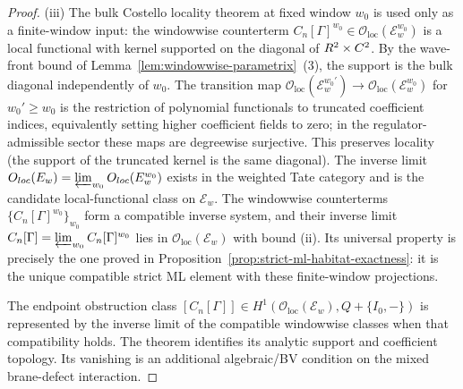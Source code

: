 \begin{proof}
  (iii) The bulk Costello locality theorem at fixed window $w_0$
  is used only as a finite-window input: the windowwise counterterm
  $C_n[\Gamma]^{w_0}\in\mathcal O_{\mathrm{loc}}(\mathcal E_w^{w_0})$
  is a local functional with kernel supported on the diagonal of
  $\R^2\times\C^2$. By the wave-front bound of
  Lemma~\ref{lem:windowwise-parametrix}~(3), the support is the
  bulk diagonal independently of $w_0$. The transition map
  $\mathcal O_{\mathrm{loc}}(\mathcal E_w^{w_0'})\to
  \mathcal O_{\mathrm{loc}}(\mathcal E_w^{w_0})$ for $w_0'\geq w_0$
  is the restriction of polynomial functionals to truncated
  coefficient indices, equivalently setting higher coefficient fields
  to zero; in the regulator-admissible sector these maps are
  degreewise surjective.  This preserves locality (the support of the
  truncated kernel is the same diagonal). The inverse limit
  $\mathcal O_{\mathrm{loc}}(\mathcal E_w)=
  \varprojlim_{w_0}\mathcal O_{\mathrm{loc}}(\mathcal E_w^{w_0})$
  exists in the weighted Tate category and is the candidate
  local-functional class on $\mathcal E_w$. The windowwise counterterms
  $\{C_n[\Gamma]^{w_0}\}_{w_0}$ form a compatible inverse system,
  and their inverse limit
  $C_n[\Gamma]=\varprojlim_{w_0}C_n[\Gamma]^{w_0}$ lies in
  $\mathcal O_{\mathrm{loc}}(\mathcal E_w)$ with bound (ii).
  Its universal property is precisely the one proved in
  Proposition~\ref{prop:strict-ml-habitat-exactness}: it is the unique
  compatible strict ML element with these finite-window projections.

  The endpoint obstruction class
  $[C_n[\Gamma]]\in H^1(\mathcal O_{\mathrm{loc}}(\mathcal E_w),
  Q+\{I_0,-\})$ is represented by the inverse limit of the compatible
  windowwise classes when that compatibility holds.  The theorem
  identifies its analytic support and coefficient topology.  Its
  vanishing is an additional algebraic/BV condition on the mixed
  brane-defect interaction.
\end{proof}

